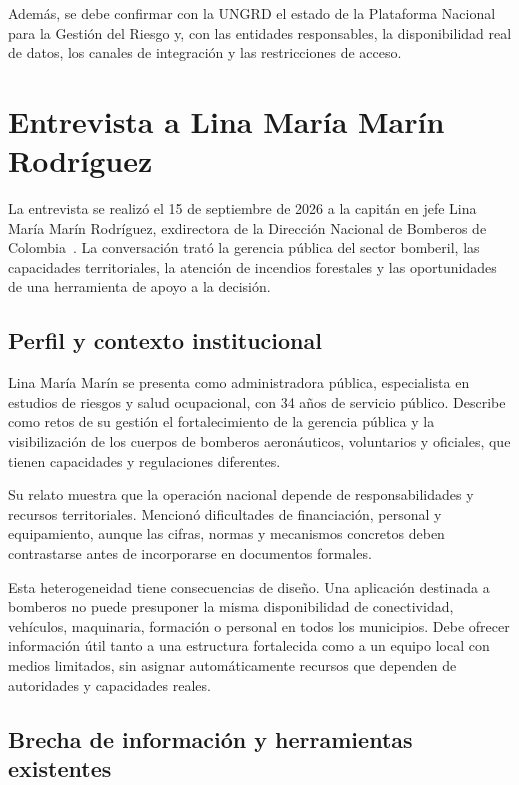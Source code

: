Además, se debe confirmar con la UNGRD el estado de la Plataforma Nacional para la Gestión del Riesgo y, con las entidades responsables, la disponibilidad real de datos, los canales de integración y las restricciones de acceso.

\section{Entrevista a Lina María Marín Rodríguez}\label{sec:marin}

La entrevista se realizó el 15 de septiembre de 2026 a la capitán en jefe Lina María Marín Rodríguez, exdirectora de la Dirección Nacional de Bomberos de Colombia~\cite{entrevistaMarin2026}. La conversación trató la gerencia pública del sector bomberil, las capacidades territoriales, la atención de incendios forestales y las oportunidades de una herramienta de apoyo a la decisión.

\subsection{Perfil y contexto institucional}

Lina María Marín se presenta como administradora pública, especialista en estudios de riesgos y salud ocupacional, con 34 años de servicio público. Describe como retos de su gestión el fortalecimiento de la gerencia pública y la visibilización de los cuerpos de bomberos aeronáuticos, voluntarios y oficiales, que tienen capacidades y regulaciones diferentes.

Su relato muestra que la operación nacional depende de responsabilidades y recursos territoriales. Mencionó dificultades de financiación, personal y equipamiento, aunque las cifras, normas y mecanismos concretos deben contrastarse antes de incorporarse en documentos formales.

Esta heterogeneidad tiene consecuencias de diseño. Una aplicación destinada a bomberos no puede presuponer la misma disponibilidad de conectividad, vehículos, maquinaria, formación o personal en todos los municipios. Debe ofrecer información útil tanto a una estructura fortalecida como a un equipo local con medios limitados, sin asignar automáticamente recursos que dependen de autoridades y capacidades reales.

\subsection{Brecha de información y herramientas existentes}

